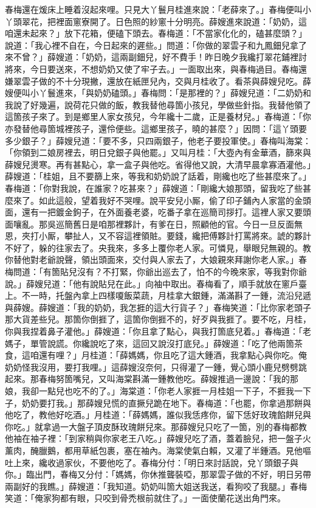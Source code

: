 春梅還在煖床上睡着沒起來哩。{}只見大丫鬟月桂進來說：「老薛來了。」春梅便叫小丫頭翠花，把裡面窻寮開了。日色照的紗窻十分明亮。薛嫂進來說道：「奶奶，這咱還未起來？」放下花箱，便磕下頭去。春梅道：「不當家化化的，磕甚麼頭？」說道：「我心裡不自在，今日起來的遲些。」問道：「你做的翠雲子和九鳳鈿兒拿了來不曾？」薛嫂道：「奶奶，這兩副鈿兒，好不費手！昨日晚夕我纔打翠花鋪裡討將來，今日要送來，不想奶奶又使了牢子去。」一面取出來，與春梅過目。春梅還嫌翠雲子做的不十分現撇，{}還放在紙匣兒內，交與月桂收了。看茶與薛嫂兒吃。薛嫂便叫小丫鬟進來，「與奶奶磕頭。」春梅問：「是那裡的？」薛嫂兒道：「二奶奶和我說了好幾遍，說荷花只做的飯，教我替他尋箇小孩兒，學做些針指。我替他領了這箇孩子來了。到是鄉里人家女孩兒，今年纔十二歲，正是養材兒。」春梅道：「你亦發替他尋箇城裡孩子，還伶便些。這鄉里孩子，曉的甚麼？」因問：「這丫頭要多少銀子？」薛嫂兒道：「要不多，只四兩銀子，他老子要投軍使。」春梅叫海棠：「你領到二娘房裡去，明日兌銀子與他罷。」又叫月桂：「大壺內有金華酒，篩來與薛嫂兒燙寒。再有甚點心，拿一盒子與他吃。省得他又說，大清早晨拿寡酒灌他。」薛嫂道：「桂姐，且不要篩上來，等我和奶奶說了話着，剛纔也吃了些甚麼來了。」春梅道：「你對我說，在誰家？吃甚來？」薛嫂道：「剛纔大娘那頭，留我吃了些甚麼來了。如此這般，望着我好不哭哩。說平安兒小厮，偷了印子鋪內人家當的金頭面，還有一把鍍金鉤子，在外面養老婆，吃番子拿在巡簡司拶打。這裡人家又要頭面嚷亂。那吳巡簡舊日是咱那裡夥計，有爹在日，照顧他的官。今日一旦反面無恩，夾打小厮，攀扯人，又不容這裡領賍。要錢，纔把傅夥計打罵將來。諕的夥計不好了，躲的往家去了。央我來，多多上覆你老人家。可憐見，舉眼兒無親的。教你替他對老爺說聲，領出頭面來，交付與人家去了，大娘親來拜謝你老人家。」春梅問道：「有箇貼兒沒有？不打緊，你爺出巡去了，怕不的今晚來家，等我對你爺說。」{}薛嫂兒道：「他有說貼兒在此。」向袖中取出。春梅看了，順手就放在窻戶臺上。不一時，托盤內拿上四樣嗄飯菜蔬，月桂拿大銀鍾，滿滿斟了一鍾，流沿兒遞與薛嫂。薛嫂道：「我的奶奶，我怎捱的這大行貨子？」春梅笑道：「比你家老頭子那大貨差些兒。{}那箇你倒捱了，這箇你倒捱不的，好歹與我捱了。要不吃，月桂，你與我捏着鼻子灌他。」薛嫂道：「你且拿了點心，與我打箇底兒着。」春梅道：「老媽子，單管說謊。你纔說吃了來，這回又說沒打底兒。」薛嫂道：「吃了他兩箇茶食，這咱還有哩？」月桂道：「薛媽媽，你且吃了這大鍾酒，我拿點心與你吃。俺奶奶怪我沒用，要打我哩。」這薛嫂沒奈何，只得灌了一鍾，覺心頭小鹿兒劈劈跳起來。那春梅努箇嘴兒，又叫海棠斟滿一鍾教他吃。薛嫂推過一邊說：「我的那娘，我卻一點兒也吃不的了。」海棠道：「你老人家捱一月桂姐一下子，不捱我一下子，奶奶要打我。」那薛嫂兒慌的直撅兒跪在地下。春梅道：「也罷，你拿過那餅與他吃了，教他好吃酒。」月桂道：「薛媽媽，誰似我恁疼你，留下恁好玫瑰餡餅兒與你吃。」就拿過一大盤子頂皮酥玫瑰餅兒來。那薛嫂兒只吃了一箇，別的春梅都教他袖在袖子裡：「到家稍與你家老王八吃。」薛嫂兒吃了酒，蓋着臉兒，把一盤子火薰肉，醃臘鵝，都用草紙包裹，塞在袖內。{}海棠使氣白賴，又灌了半鍾酒。見他嘔吐上來，纔收過家伙，不要他吃了。春梅分付：「明日來討話說，兌丫頭銀子與你。」臨出門，春梅又分付：「媽媽，你休推聾裝啞，那翠雲子做的不好，明日另帶兩副好的我瞧。」薛嫂道：「我知道。奶奶叫箇大姐送我送，看狗咬了我腿。」春梅笑道：「俺家狗都有眼，只咬到骨禿根前就住了。」{}一面使蘭花送出角門來。


